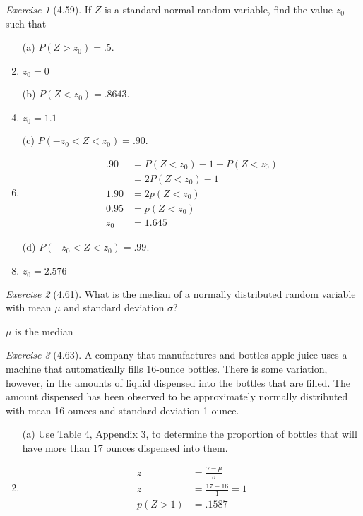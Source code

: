 \documentclass[12pt]{amsart}
\makeatletter
\theoremstyle{remark}
\newtheorem*{exercise}{Exercise}%
\renewenvironment{proof}[1][\proofname]{\par\doublespacing
  \pushQED{\qed}%
  \normalfont \topsep6\p@\@plus6\p@\relax
  \list{}{%
    \settowidth{\leftmargin}{\itshape\proofname:\hskip\labelsep}%
    \setlength{\labelwidth}{0pt}%
    \setlength{\itemindent}{-\leftmargin}%
  }%
  \item[\hskip\labelsep\itshape#1\@addpunct{:}]\ignorespaces
}{%
  \popQED\endlist\@endpefalse
  \singlespacing
}
\theoremstyle{mycomment}
\makeatother
\begin{document}
\begin{exercise}[4.59]
If $Z$ is a standard normal random variable, find the value $z_0$ such that

\begin{enumerate}
    \item[(a)] $P(Z > z_0) = .5$.
\begin{proof}[Solution]
$z_0 = 0$ 
\end{proof}
    \item[(b)] $P(Z < z_0) = .8643$.
\begin{proof}[Solution]
 $z_0 = 1.1$
\end{proof}
    \item[(c)] $P(-z_0 < Z < z_0) = .90$.
\begin{proof}[Solution]
	\begin{align*}
		.90 &=  P(Z<z_0) - 1 + P(Z< z_0) \\
		    &= 2P(Z<z_0) - 1 \\
		1.90 &= 2p(Z<z_0) \\
		0.95 &= p(Z<z_0) \\
		z_0 &= 1.645 
	\end{align*}
\end{proof}
    \item[(d)] $P(-z_0 < Z < z_0) = .99$.
\begin{proof}[Solution]
	$z_0 = 2.576$
\end{proof}
\end{enumerate}
\end{exercise}

\begin{exercise}[4.61]
What is the median of a normally distributed random variable with mean $\mu$ and standard deviation $\sigma$?

\begin{proof}[Solution]
$\mu$ is the median 
\end{proof}
\end{exercise}

\begin{exercise}[4.63]
A company that manufactures and bottles apple juice uses a machine that automatically fills 16-ounce bottles. There is some variation, however, in the amounts of liquid dispensed into the bottles that are filled. The amount dispensed has been observed to be approximately normally distributed with mean 16 ounces and standard deviation 1 ounce.

\begin{enumerate}
    \item[(a)] Use Table 4, Appendix 3, to determine the proportion of bottles that will have more than 17 ounces dispensed into them.
\begin{proof}[Solution]
	\begin{align*}
		z &= \frac{\gamma - \mu}{\sigma} \\
		z &= \frac{17-16}{1} = 1 \\
		p(Z > 1) &= .1587
	\end{align*}
\end{proof}
\end{enumerate}
\end{exercise}
\end{document}
